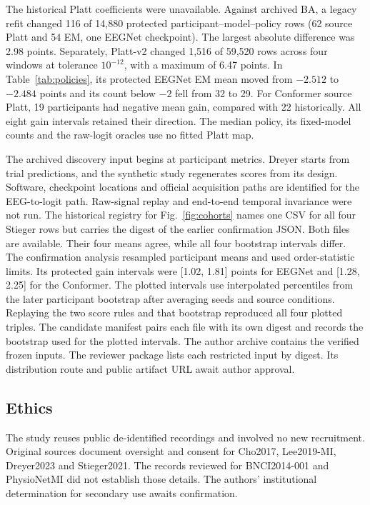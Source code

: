 The historical Platt coefficients were unavailable. Against archived BA, a legacy refit changed 116 of 14,880 protected participant--model--policy rows (62 source Platt and 54 EM, one EEGNet checkpoint). The largest absolute difference was 2.98 points. Separately, Platt-v2 changed 1,516 of 59,520 rows across four windows at tolerance $10^{-12}$, with a maximum of 6.47 points. In Table~\ref{tab:policies}, its protected EEGNet EM mean moved from $-2.512$ to $-2.484$ points and its count below $-2$ fell from 32 to 29. For Conformer source Platt, 19 participants had negative mean gain, compared with 22 historically. All eight gain intervals retained their direction. The median policy, its fixed-model counts and the raw-logit oracles use no fitted Platt map.

The archived discovery input begins at participant metrics. Dreyer starts from trial predictions, and the synthetic study regenerates scores from its design. Software, checkpoint locations and official acquisition paths are identified for the EEG-to-logit path. Raw-signal replay and end-to-end temporal invariance were not run. The historical registry for Fig.~\ref{fig:cohorts} names one CSV for all four Stieger rows but carries the digest of the earlier confirmation JSON. Both files are available. Their four means agree, while all four bootstrap intervals differ. The confirmation analysis resampled participant means and used order-statistic limits. Its protected gain intervals were [1.02, 1.81] points for EEGNet and [1.28, 2.25] for the Conformer. The plotted intervals use interpolated percentiles from the later participant bootstrap after averaging seeds and source conditions. Replaying the two score rules and that bootstrap reproduced all four plotted triples. The candidate manifest pairs each file with its own digest and records the bootstrap used for the plotted intervals. The author archive contains the verified frozen inputs. The reviewer package lists each restricted input by digest. Its distribution route and public artifact URL await author approval.

\subsection{Ethics}
The study reuses public de-identified recordings and involved no new recruitment. Original sources document oversight and consent for Cho2017, Lee2019-MI, Dreyer2023 and Stieger2021. The records reviewed for BNCI2014-001 and PhysioNetMI did not establish those details. The authors' institutional determination for secondary use awaits confirmation.

